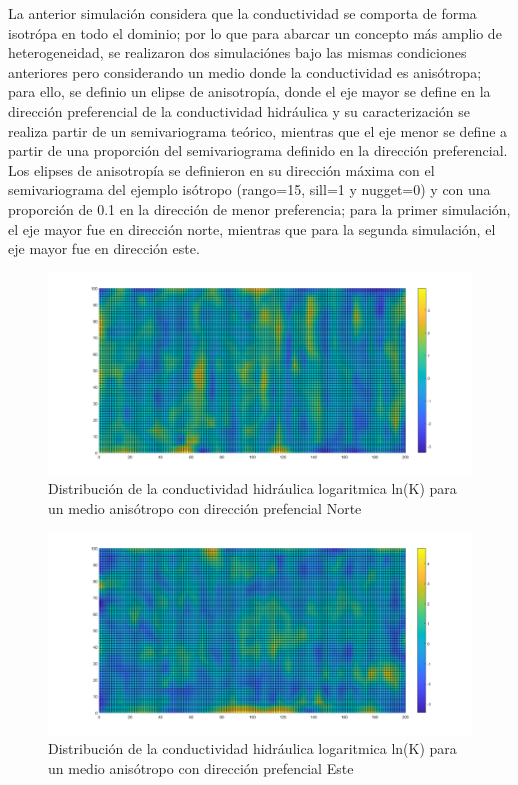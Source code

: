 La anterior simulación considera que la conductividad se comporta de forma isotrópa en todo el dominio; por lo que para abarcar un concepto más amplio de heterogeneidad, se realizaron dos simulaciónes bajo las mismas condiciones anteriores pero considerando un medio donde la conductividad es anisótropa; para ello, se definio un elipse de anisotropía, donde el eje mayor se define en la dirección preferencial de la conductividad hidráulica y su caracterización se realiza partir de un semivariograma teórico, mientras que el eje menor se define a partir de una proporción del semivariograma definido en la dirección preferencial. 
\\

Los elipses de anisotropía se definieron en su dirección máxima con el semivariograma del ejemplo isótropo (rango=15, sill=1 y nugget=0) y con una proporción de 0.1 en la dirección de menor preferencia; para la primer simulación, el eje mayor fue en dirección norte, mientras que para la segunda simulación, el eje mayor fue en dirección este.

\begin{figure}[H]
\centering
\includegraphics[scale=0.45]{Figura38}
\caption{ Distribución de la conductividad hidráulica logaritmica ln(K) para un medio anisótropo con dirección prefencial Norte }
\label{Figura3:10}
\end{figure}

 \begin{figure}[H]
\centering
\includegraphics[scale=0.45]{Figura39}
\caption{ Distribución de la conductividad hidráulica logaritmica ln(K) para un medio anisótropo con dirección prefencial Este }
\label{Figura3:11}
\end{figure} 

